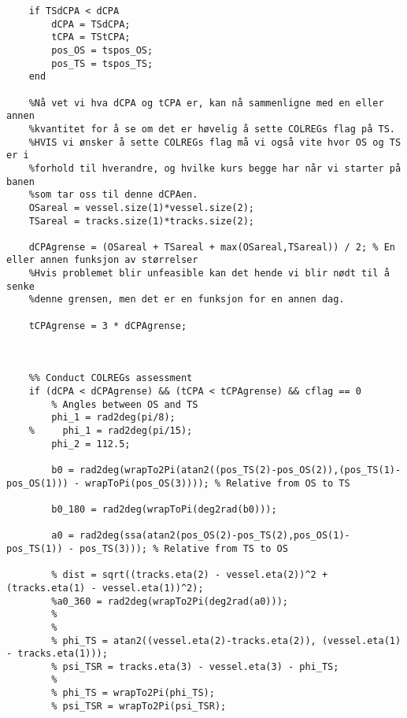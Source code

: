 \begin{lstlisting}
    if TSdCPA < dCPA
        dCPA = TSdCPA;
        tCPA = TStCPA;
        pos_OS = tspos_OS;
        pos_TS = tspos_TS;
    end
    
    %Nå vet vi hva dCPA og tCPA er, kan nå sammenligne med en eller annen
    %kvantitet for å se om det er høvelig å sette COLREGs flag på TS.
    %HVIS vi ønsker å sette COLREGs flag må vi også vite hvor OS og TS er i
    %forhold til hverandre, og hvilke kurs begge har når vi starter på banen
    %som tar oss til denne dCPAen.
    OSareal = vessel.size(1)*vessel.size(2);
    TSareal = tracks.size(1)*tracks.size(2);
    
    dCPAgrense = (OSareal + TSareal + max(OSareal,TSareal)) / 2; % En eller annen funksjon av størrelser
    %Hvis problemet blir unfeasible kan det hende vi blir nødt til å senke
    %denne grensen, men det er en funksjon for en annen dag.
    
    tCPAgrense = 3 * dCPAgrense;
    
    
    
    %% Conduct COLREGs assessment
    if (dCPA < dCPAgrense) && (tCPA < tCPAgrense) && cflag == 0
        % Angles between OS and TS
        phi_1 = rad2deg(pi/8);
    %     phi_1 = rad2deg(pi/15);
        phi_2 = 112.5;
        
        b0 = rad2deg(wrapTo2Pi(atan2((pos_TS(2)-pos_OS(2)),(pos_TS(1)-pos_OS(1))) - wrapToPi(pos_OS(3)))); % Relative from OS to TS
    
        b0_180 = rad2deg(wrapToPi(deg2rad(b0)));
        
        a0 = rad2deg(ssa(atan2(pos_OS(2)-pos_TS(2),pos_OS(1)-pos_TS(1)) - pos_TS(3))); % Relative from TS to OS
        
        % dist = sqrt((tracks.eta(2) - vessel.eta(2))^2 + (tracks.eta(1) - vessel.eta(1))^2);
        %a0_360 = rad2deg(wrapTo2Pi(deg2rad(a0)));
        % 
        % 
        % phi_TS = atan2((vessel.eta(2)-tracks.eta(2)), (vessel.eta(1) - tracks.eta(1)));
        % psi_TSR = tracks.eta(3) - vessel.eta(3) - phi_TS;
        % 
        % phi_TS = wrapTo2Pi(phi_TS);
        % psi_TSR = wrapTo2Pi(psi_TSR);
        

\end{lstlisting}
